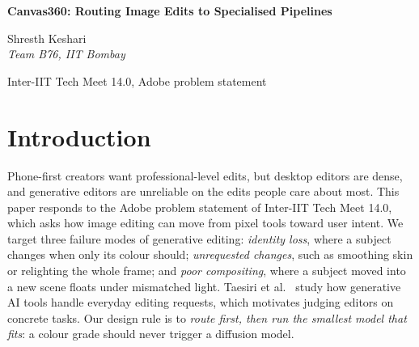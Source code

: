 \documentclass[10pt,twocolumn,a4paper]{article}
\title{}
\author{}
\date{}
\begin{document}
\pagestyle{empty}

\begin{center}
{\Large\bfseries Canvas360: Routing Image Edits to Specialised Pipelines\par}
\vspace{3pt}
{\normalsize Shresth Keshari\\[-1pt] \textit{Team B76, IIT Bombay}\par}
\vspace{1pt}
{\small Inter-IIT Tech Meet 14.0, Adobe problem statement}
\end{center}

\begin{abstract}
\noindent Generative image editors are reliable on broad requests but often fail on edits that need identity preservation, restraint, or physical consistency. We present Canvas360, a prototype that treats editing as intent routing. A Flan-T5 classifier maps each prompt to one of five intents, and the request goes to the cheapest pipeline that can serve it: semantic colour grading, structure-locked stylisation, general instruction editing, a draft-critique-refine remix loop, or manual tools. On hot runs, colour grading takes about 0.90\,s and stylisation 7.4--9.1\,s. One logged general edit takes 242.6\,s. The repository contains a Tkinter editor with a local language-model command parser and a SAM~2 segmentation wrapper. The generative pipelines are described but their code is not included. No human-preference or identity-similarity evaluation was performed.
\end{abstract}

\section{Introduction}
Phone-first creators want professional-level edits, but desktop editors are dense, and generative editors are unreliable on the edits people care about most. This paper responds to the Adobe problem statement of Inter-IIT Tech Meet 14.0, which asks how image editing can move from pixel tools toward user intent. We target three failure modes of generative editing: \emph{identity loss}, where a subject changes when only its colour should; \emph{unrequested changes}, such as smoothing skin or relighting the whole frame; and \emph{poor compositing}, where a subject moved into a new scene floats under mismatched light. Taesiri et al.~\cite{taesiri2025} study how generative AI tools handle everyday editing requests, which motivates judging editors on concrete tasks. Our design rule is to \emph{route first, then run the smallest model that fits}: a colour grade should never trigger a diffusion model.
\end{document}
